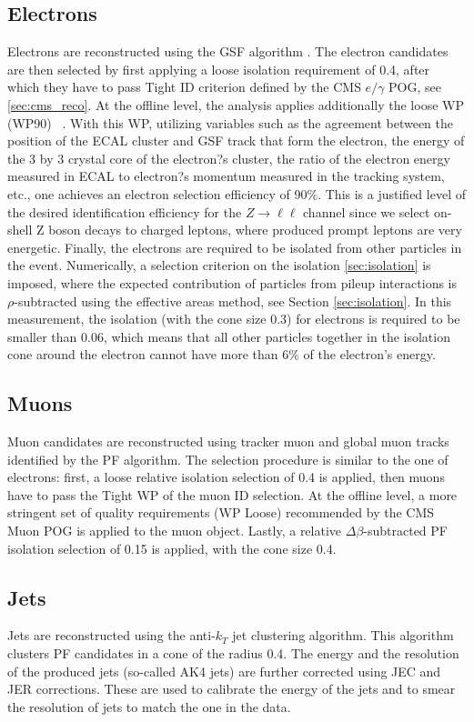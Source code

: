 \begin{small}
\subsection{Electrons}\label{sec:electrons}
Electrons are reconstructed using the GSF algorithm \cite{GSF}. The electron candidates are then selected by first applying a loose isolation requirement of 0.4, after which they have to pass Tight ID criterion defined by the CMS $e/\gamma$ POG, see \ref{sec:cms_reco}. At the offline level, the analysis applies additionally the loose WP (WP90)  ~\cite{vhbbAN}. With this WP, utilizing variables such as the agreement between the position of the ECAL cluster and GSF track that form the electron, the energy of the 3 by 3 crystal core of the electron?s cluster, the ratio of the electron energy measured in ECAL to electron?s momentum measured in the tracking system, etc., one achieves an electron selection efficiency of 90$\%$. This is a justified level of the desired identification efficiency for the $Z \to \ell \ell$ channel since we select on-shell Z boson decays to charged leptons, where produced prompt leptons are very energetic. Finally, the electrons are required to be isolated from other particles in the event. Numerically, a selection criterion on the isolation \ref{sec:isolation} is imposed, where the expected contribution of particles from pileup interactions is $\rho$-subtracted using the effective areas method, see Section \ref{sec:isolation}. In this measurement, the isolation (with the cone size 0.3) for electrons is required to be smaller than 0.06, which means that all other particles together in the isolation cone around the electron cannot have more than 6$\%$ of the electron's energy.

\subsection{Muons}\label{sec:muons}
Muon candidates are reconstructed using tracker muon and global muon tracks identified by the PF algorithm. The selection procedure is similar to the one of electrons: first, a loose relative isolation selection of 0.4 is applied, then muons have to pass the Tight WP of the muon ID selection. 
At the offline level, a more stringent set of quality requirements (WP Loose) recommended by the CMS Muon POG is applied to the muon object.
Lastly, a relative $\Delta\beta$-subtracted PF isolation selection of 0.15 is applied, with the cone size 0.4.

\subsection{Jets}\label{sec:jets}
Jets are reconstructed using the anti-$k_T$ jet clustering algorithm. This algorithm clusters PF candidates in a cone of the radius 0.4. The energy and the resolution of the produced jets (so-called AK4 jets) are further corrected using JEC and JER corrections. These are used to calibrate the energy of the jets and to smear the resolution of jets to match the one in the data. 


\end{small}
